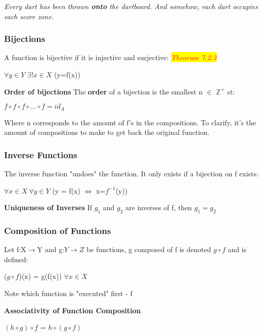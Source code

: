 \documentclass{article}
\newcommand{\theorum}[1]{\quad \quad \colorbox{yellow}{\textit{\textcolor{red}{Theorum #1}}}}
\newcommand{\sub}[1]{\vspace{10pt}\textbf{#1}}
\newcommand{\sbreak}{\vspace{10pt}}
\begin{document}
\textit{Every dart has been thrown \textbf{onto} the dartboard. And somehow, each dart occupies each score zone.}

\subsubsection{Bijections}
A function is bijective if it is injective and surjective: \theorum{7.2.3}
\begin{center}
    $\forall y \in Y$ $\exists!x\in X$ (y=f(x))
\end{center}

\sbreak

\sub{Order of bijections}
The \textbf{order} of a bijection is the smallest n $\in$ $\mathbb{Z}^+$ st:
\begin{center}
    $f \circ f \circ f \circ ... \circ f = id_A$
\end{center}
Where n corresponds to the amount of f's in the compositions. To clarify, it's the amount of compositions to make to get back the original function.

\subsubsection{Inverse Functions}
The inverse function "undoes" the function. It only exists if a bijection on f exists:
\begin{center}
    $\forall x \in X\ \forall y \in Y$ (y = f(x) $\Leftrightarrow$ x=$f^{-1}$(y))
\end{center}

\sub{Uniqueness of Inverses}
If $g_1$ and $g_2$ are inverses of f, then $g_1 = g_2$

\subsubsection{Composition of Functions}
Let f:X$\rightarrow$Y and g:$Y\rightarrow Z$ be functions, g composed of f is denoted $g\circ f$ and is defined:
\begin{center}
    ($g \circ f$)(x) = g(f(x)) $\forall x \in X$
\end{center}

\sbreak

Note which function is "executed" first - f

\sub{Associativity of Function Composition}
\begin{center}
    $(h \circ g) \circ f$ = $h \circ (g\circ f)$
\end{center}
\end{document}
